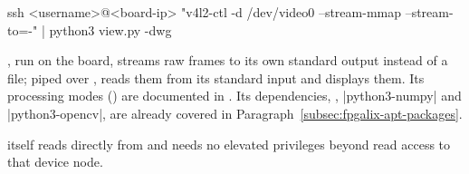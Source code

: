 \begin{shellcodehost}
ssh <username>@<board-ip> "v4l2-ctl -d /dev/video0 --stream-mmap --stream-to=-" | python3 view.py -dwg
\end{shellcodehost}

, run on the board, streams raw frames to its own standard output instead of a file; piped over ,  reads them from its standard input and displays them. Its processing modes () are documented in \cite[``view.py --- Live preview'']{DRV2-README}. Its dependencies, , |python3-numpy| and |python3-opencv|, are already covered in Paragraph~\ref{subsec:fpgalix-apt-packages}.

 itself reads directly from  and needs no elevated privileges beyond read access to that device node.
